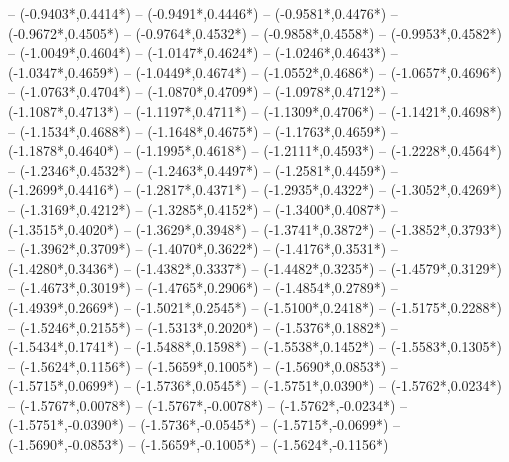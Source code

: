 {	-- ({-0.9403*\dx},{0.4414*\dy})
	-- ({-0.9491*\dx},{0.4446*\dy})
	-- ({-0.9581*\dx},{0.4476*\dy})
	-- ({-0.9672*\dx},{0.4505*\dy})
	-- ({-0.9764*\dx},{0.4532*\dy})
	-- ({-0.9858*\dx},{0.4558*\dy})
	-- ({-0.9953*\dx},{0.4582*\dy})
	-- ({-1.0049*\dx},{0.4604*\dy})
	-- ({-1.0147*\dx},{0.4624*\dy})
	-- ({-1.0246*\dx},{0.4643*\dy})
	-- ({-1.0347*\dx},{0.4659*\dy})
	-- ({-1.0449*\dx},{0.4674*\dy})
	-- ({-1.0552*\dx},{0.4686*\dy})
	-- ({-1.0657*\dx},{0.4696*\dy})
	-- ({-1.0763*\dx},{0.4704*\dy})
	-- ({-1.0870*\dx},{0.4709*\dy})
	-- ({-1.0978*\dx},{0.4712*\dy})
	-- ({-1.1087*\dx},{0.4713*\dy})
	-- ({-1.1197*\dx},{0.4711*\dy})
	-- ({-1.1309*\dx},{0.4706*\dy})
	-- ({-1.1421*\dx},{0.4698*\dy})
	-- ({-1.1534*\dx},{0.4688*\dy})
	-- ({-1.1648*\dx},{0.4675*\dy})
	-- ({-1.1763*\dx},{0.4659*\dy})
	-- ({-1.1878*\dx},{0.4640*\dy})
	-- ({-1.1995*\dx},{0.4618*\dy})
	-- ({-1.2111*\dx},{0.4593*\dy})
	-- ({-1.2228*\dx},{0.4564*\dy})
	-- ({-1.2346*\dx},{0.4532*\dy})
	-- ({-1.2463*\dx},{0.4497*\dy})
	-- ({-1.2581*\dx},{0.4459*\dy})
	-- ({-1.2699*\dx},{0.4416*\dy})
	-- ({-1.2817*\dx},{0.4371*\dy})
	-- ({-1.2935*\dx},{0.4322*\dy})
	-- ({-1.3052*\dx},{0.4269*\dy})
	-- ({-1.3169*\dx},{0.4212*\dy})
	-- ({-1.3285*\dx},{0.4152*\dy})
	-- ({-1.3400*\dx},{0.4087*\dy})
	-- ({-1.3515*\dx},{0.4020*\dy})
	-- ({-1.3629*\dx},{0.3948*\dy})
	-- ({-1.3741*\dx},{0.3872*\dy})
	-- ({-1.3852*\dx},{0.3793*\dy})
	-- ({-1.3962*\dx},{0.3709*\dy})
	-- ({-1.4070*\dx},{0.3622*\dy})
	-- ({-1.4176*\dx},{0.3531*\dy})
	-- ({-1.4280*\dx},{0.3436*\dy})
	-- ({-1.4382*\dx},{0.3337*\dy})
	-- ({-1.4482*\dx},{0.3235*\dy})
	-- ({-1.4579*\dx},{0.3129*\dy})
	-- ({-1.4673*\dx},{0.3019*\dy})
	-- ({-1.4765*\dx},{0.2906*\dy})
	-- ({-1.4854*\dx},{0.2789*\dy})
	-- ({-1.4939*\dx},{0.2669*\dy})
	-- ({-1.5021*\dx},{0.2545*\dy})
	-- ({-1.5100*\dx},{0.2418*\dy})
	-- ({-1.5175*\dx},{0.2288*\dy})
	-- ({-1.5246*\dx},{0.2155*\dy})
	-- ({-1.5313*\dx},{0.2020*\dy})
	-- ({-1.5376*\dx},{0.1882*\dy})
	-- ({-1.5434*\dx},{0.1741*\dy})
	-- ({-1.5488*\dx},{0.1598*\dy})
	-- ({-1.5538*\dx},{0.1452*\dy})
	-- ({-1.5583*\dx},{0.1305*\dy})
	-- ({-1.5624*\dx},{0.1156*\dy})
	-- ({-1.5659*\dx},{0.1005*\dy})
	-- ({-1.5690*\dx},{0.0853*\dy})
	-- ({-1.5715*\dx},{0.0699*\dy})
	-- ({-1.5736*\dx},{0.0545*\dy})
	-- ({-1.5751*\dx},{0.0390*\dy})
	-- ({-1.5762*\dx},{0.0234*\dy})
	-- ({-1.5767*\dx},{0.0078*\dy})
	-- ({-1.5767*\dx},{-0.0078*\dy})
	-- ({-1.5762*\dx},{-0.0234*\dy})
	-- ({-1.5751*\dx},{-0.0390*\dy})
	-- ({-1.5736*\dx},{-0.0545*\dy})
	-- ({-1.5715*\dx},{-0.0699*\dy})
	-- ({-1.5690*\dx},{-0.0853*\dy})
	-- ({-1.5659*\dx},{-0.1005*\dy})
	-- ({-1.5624*\dx},{-0.1156*\dy})
}
